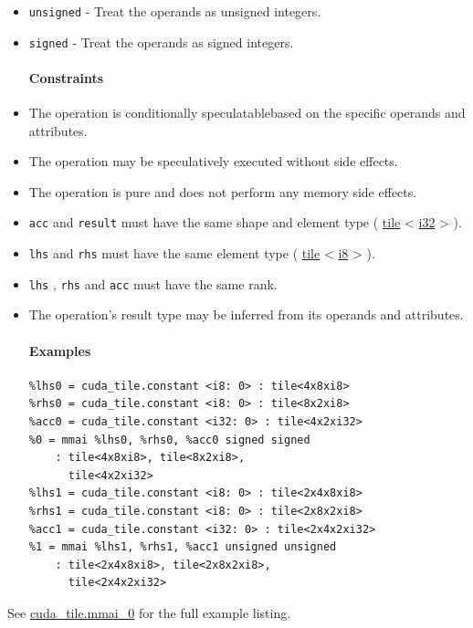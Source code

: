 \documentclass{article}
\begin{document}
\begin{itemize}
\item \texttt{unsigned} - Treat the operands as unsigned integers.
\item \texttt{signed} - Treat the operands as signed integers.


\paragraph{Constraints}

\item The operation is conditionally speculatablebased on the specific operands and attributes.
\item The operation may be speculatively executed without side effects.
\item The operation is pure and does not perform any memory side effects.
\item \texttt{acc} and \texttt{result} must have the same shape and element type ( \href{https://docs.nvidia.com/cuda/tile-ir/latest/sections/types.html#type-tile}{tile} < \href{https://docs.nvidia.com/cuda/tile-ir/latest/sections/types.html#subsection-element-types}{i32} > ).
\item \texttt{lhs} and \texttt{rhs} must have the same element type ( \href{https://docs.nvidia.com/cuda/tile-ir/latest/sections/types.html#type-tile}{tile} < \href{https://docs.nvidia.com/cuda/tile-ir/latest/sections/types.html#subsection-element-types}{i8} > ).
\item \texttt{lhs} , \texttt{rhs} and \texttt{acc} must have the same rank.
\item The operation's result type may be inferred from its operands and attributes.


\paragraph{Examples}

\begin{lstlisting}
%lhs0 = cuda_tile.constant <i8: 0> : tile<4x8xi8>
%rhs0 = cuda_tile.constant <i8: 0> : tile<8x2xi8>
%acc0 = cuda_tile.constant <i32: 0> : tile<4x2xi32>
%0 = mmai %lhs0, %rhs0, %acc0 signed signed
    : tile<4x8xi8>, tile<8x2xi8>,
      tile<4x2xi32>
%lhs1 = cuda_tile.constant <i8: 0> : tile<2x4x8xi8>
%rhs1 = cuda_tile.constant <i8: 0> : tile<2x8x2xi8>
%acc1 = cuda_tile.constant <i32: 0> : tile<2x4x2xi32>
%1 = mmai %lhs1, %rhs1, %acc1 unsigned unsigned
    : tile<2x4x8xi8>, tile<2x8x2xi8>,
      tile<2x4x2xi32>
\end{lstlisting}

\end{itemize}
See \href{https://docs.nvidia.com/cuda/tile-ir/latest/sections/appendix.html#example-cuda-tile-mmai-0}{cuda\_tile.mmai\_0} for the full example listing.
\end{document}
